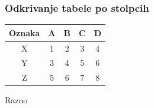 \documentclass{beamer}
\begin{document}
\begin{frame}
\frametitle{Odkrivanje tabele po stolpcih}   
\begin{table}
\begin{tabular}{c |!{} c!{} c!{ }c!{} c!{\onslide}}

      Oznaka& A& B& C& D \\ \hline
      X& 1& 2& 3& 4 \\
      Y& 3& 4& 5& 6 \\
      Z& 5& 6& 7& 8 \\

\end{tabular}
\end{table}
\end{frame}

Razno


\end{document}
